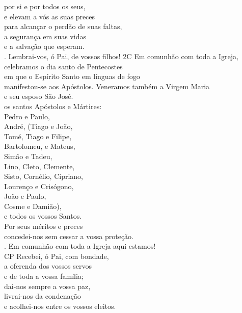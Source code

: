 \documentclass{book}
\begin{document}
\begin{flushleft}
    por si e por todos os seus, \\
    e elevam a vós as suas preces \\
    para alcançar o perdão de suas faltas, \\
    a segurança em suas vidas \\
    e a salvação que esperam.
    \vspace{.1cm} \\
    {\color{red} \Rbar.} Lembrai-vos, ó Pai, de vossos filhos!
    \newpage
    {\color{red}2C} Em comunhão com toda a Igreja, \\
    celebramos o dia santo de Pentecostes \\
    em que o Espírito Santo em línguas de fogo \\
    manifestou-se aos Apóstolos.
    Veneramos também a Virgem Maria \\
    e seu esposo São José. \\
    os santos Apóstolos e Mártires: \\
    Pedro e Paulo, \\
    André, {\color{red}(}Tiago e João, \\
    Tomé, Tiago e Filipe, \\
    Bartolomeu, e Mateus, \\
    Simão e Tadeu, \\
    Lino, Cleto, Clemente, \\
    Sisto, Cornélio, Cipriano, \\
    Lourenço e Crisógono, \\
    João e Paulo, \\
    Cosme e Damião{\color{red})}, \\
    e todos os vossos Santos. \\
    Por seus méritos e preces \\
    concedei-nos sem cessar a vossa proteção.
    \vspace{.1cm} \\
    {\color{red} \Rbar.} Em comunhão com toda a Igreja aqui estamos!
    \vspace{.1cm} \\
    {\color{red}CP} Recebei, ó Pai, com bondade, \\
    a oferenda dos vossos servos \\
    e de toda a vossa família; \\
    dai-nos sempre a vossa paz, \\
    livrai-nos da condenação \\
    e acolhei-nos entre os vossos eleitos.

\end{flushleft}
\end{document}
